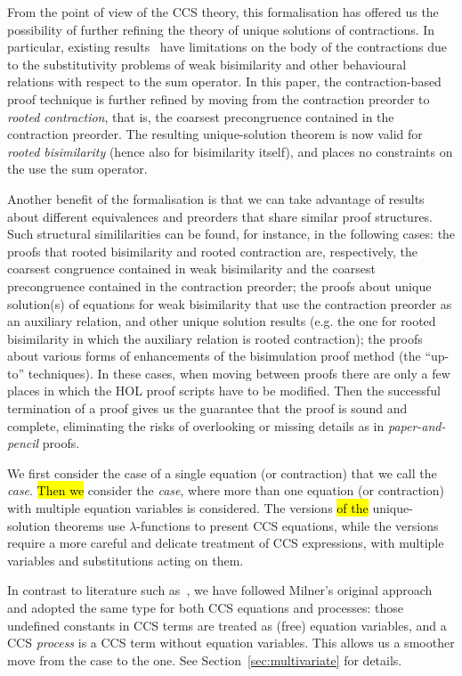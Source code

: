 From the point of view of the CCS theory, this formalisation has offered us the possibility of
further refining the theory of unique solutions of contractions.
In particular,  existing results~\cite{sangiorgi2017equations} have limitations on the body of the contractions due to the
substitutivity problems of weak bisimilarity and other behavioural relations with respect
to the sum operator.
In this paper, the contraction-based proof technique is further
refined by moving from the contraction preorder to
\emph{rooted contraction}, that is, the coarsest precongruence contained in the contraction
preorder. The resulting unique-solution theorem is now valid for
\emph{rooted bisimilarity} (hence also for bisimilarity itself), and places no 
constraints on the use the sum operator.

Another benefit of the formalisation is 
that we can take advantage of results about different 
equivalences and preorders that share similar proof structures.
Such structural simililarities can be found, for instance, in the
following cases: the proofs that rooted bisimilarity and rooted
contraction are, respectively, the coarsest congruence contained in
weak bisimilarity and the coarsest precongruence contained in the
contraction preorder; the proofs about unique solution(s) of equations
for weak bisimilarity that use the contraction preorder as an
auxiliary relation, and other unique solution results (e.g. the one
for rooted bisimilarity 
 in which the auxiliary relation is rooted contraction); the
proofs about various forms of enhancements of the bisimulation proof
method (the ``up-to'' techniques).
%
In these cases, when moving between proofs there are only a few places in
which the HOL proof scripts have to be modified.
Then the successful termination of a proof gives us the
 guarantee that the proof is
sound and complete, eliminating the risks 
of overlooking or missing details as in \emph{paper-and-pencil} proofs.

We first consider the case of a single equation (or contraction)
that we call the \emph{\univariate case}. \hl{Then we} consider
the \emph{\multivariate case}, where more than one equation
  (or contraction) with multiple equation variables is considered.
The \univariate versions \hl{of the} unique-solution theorems use
$\lambda$-functions to present CCS equations,
while the \multivariate versions require a
more careful and delicate treatment of CCS
expressions, with multiple variables and substitutions acting on them.

In contrast to literature  such as~\cite{Gorrieri:2015jt},
we have followed Milner's original approach~\cite{milner1990operational} and adopted the same
type for both CCS equations and processes: those undefined constants
in CCS terms are treated as  (free) equation variables, and a CCS
\emph{process} is a CCS term without equation variables. 
This allows us a smoother move from the \univariate case to the \multivariate
one. See Section~\ref{sec:multivariate} for  details.

